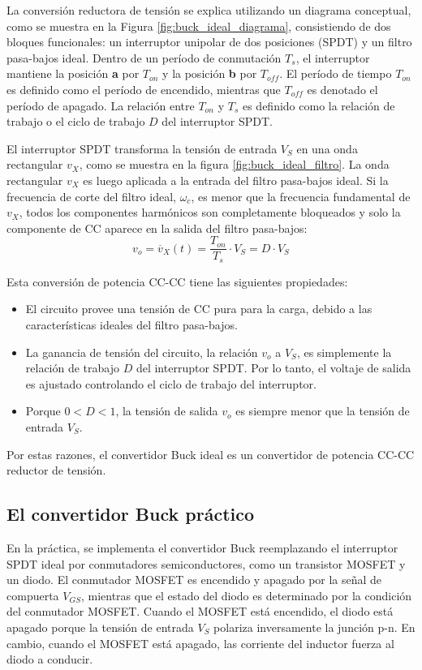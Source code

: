 La conversión reductora de tensión se explica utilizando un diagrama conceptual, como se muestra en la Figura \ref{fig:buck_ideal_diagrama}, consistiendo
de dos bloques funcionales: un interruptor unipolar de dos posiciones (SPDT) y un filtro pasa-bajos ideal. Dentro de un período de conmutación $T_s$, el
interruptor mantiene la posición \textbf{a} por $T_{on}$ y la posición \textbf{b} por $T_{off}$. El período de tiempo $T_{on}$ es definido como el período de encendido,
mientras que $T_{off}$ es denotado el período de apagado. La relación entre $T_{on}$ y $T_s$ es definido como la relación de trabajo o el ciclo de trabajo $D$ del
interruptor SPDT.

El interruptor SPDT transforma la tensión de entrada $V_S$ en una onda rectangular $v_X$, como se muestra en la figura \ref{fig:buck_ideal_filtro}.
La onda rectangular $v_X$ es luego aplicada a la entrada del filtro pasa-bajos ideal. Si la frecuencia de corte del filtro ideal, $\omega_c$, es menor que la
frecuencia fundamental de $v_X$, todos los componentes harmónicos son completamente bloqueados y solo la componente de CC aparece en la salida del filtro pasa-bajos:
\begin{equation}
    v_{o} = {\overline{v}}_X(t) = \dfrac{T_{on}}{T_{s}} \cdot V_S = D \cdot V_S
    \label{eq:buck_ideal}
\end{equation}

Esta conversión de potencia CC-CC tiene las siguientes propiedades:
\begin{itemize}[noitemsep]
    \item El circuito provee una tensión de CC pura para la carga, debido a las características ideales del filtro pasa-bajos.
    \item La ganancia de tensión del circuito, la relación $v_o$ a $V_S$, es simplemente la relación de trabajo $D$ del interruptor SPDT. Por lo tanto, el voltaje de salida
    es ajustado controlando el ciclo de trabajo del interruptor.
    \item Porque $0 < D < 1$, la tensión de salida $v_o$ es siempre menor que la tensión de entrada $V_S$.
\end{itemize}

Por estas razones, el convertidor Buck ideal es un convertidor de potencia CC-CC reductor de tensión.

\vspace{-0.5cm}
\subsection{\textbf{El convertidor Buck práctico}}
\vspace{-0.5cm}
En la práctica, se implementa el convertidor Buck reemplazando el interruptor SPDT ideal por conmutadores semiconductores, como un transistor MOSFET y un diodo.
El conmutador MOSFET es encendido y apagado por la señal de compuerta $V_{GS}$, mientras que el estado del diodo es determinado por la condición del conmutador MOSFET.
Cuando el MOSFET está encendido, el diodo está apagado porque la tensión de entrada $V_S$ polariza inversamente la junción p-n. En cambio, cuando el MOSFET está apagado,
las corriente del inductor fuerza al diodo a conducir.

